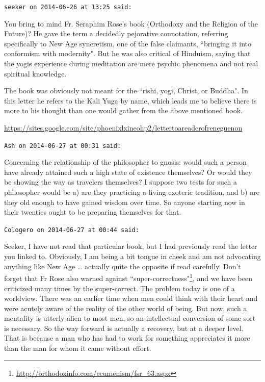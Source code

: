 \begin{footnotesize}\begin{sffamily}

\texttt{seeker on 2014-06-26 at 13:25 said: }

You bring to mind Fr. Seraphim Rose's book (Orthodoxy and the Religion of the Future)? He gave the term a decidedly pejorative connotation, referring specifically to New Age syncretism, one of the false claimants, ``bringing it into conformism with modernity". But he was also critical of Hinduism, saying that the yogis experience during meditation are mere psychic phenomena and not real spiritual knowledge.

The book was obviously not meant for the ``rishi, yogi, Christ, or Buddha". In this letter he refers to the Kali Yuga by name, which leads me to believe there is more to his thought than one would gather from the above mentioned book. 

\url{https://sites.google.com/site/phoenixlxineohp2/lettertoareaderofreneguenon}

\hfill

\texttt{Ash on 2014-06-27 at 00:31 said: }

Concerning the relationship of the philosopher to gnosis: would such a person have already attained such a high state of existence themselves? Or would they be showing the way as travelers themselves? I suppose two tests for such a philosopher would be a) are they practicing a living exoteric tradition, and b) are they old enough to have gained wisdom over time. So anyone starting now in their twenties ought to be preparing themselves for that.


\hfill

\texttt{Cologero on 2014-06-27 at 00:44 said: }

Seeker, I have not read that particular book, but I had previously read the letter you linked to. Obviously, I am being a bit tongue in cheek and am not advocating anything like New Age … actually quite the opposite if read carefully. Don't forget that Fr Rose also warned against ``super-correctness"\footnote{\url{http://orthodoxinfo.com/ecumenism/fsr_63.aspx}}, and we have been criticized many times by the super-correct. The problem today is one of a worldview. There was an earlier time when men could think with their heart and were acutely aware of the reality of the other world of being. But now, such a mentality is utterly alien to most men, so an intellectual conversion of some sort is necessary. So the way forward is actually a recovery, but at a deeper level. That is because a man who has had to work for something appreciates it more than the man for whom it came without effort.


\end{sffamily}
\end{footnotesize}
